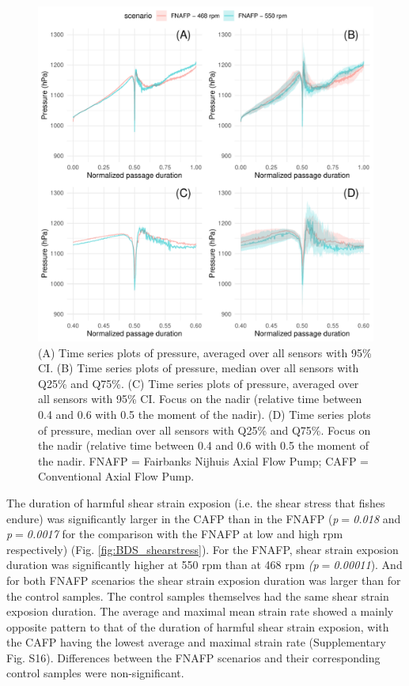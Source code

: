 \documentclass[fleqn,10pt]{wlscirep}
\begin{document}
\begin{figure}[ht]
  \centering
  \includegraphics[scale=0.7]{timeseries_selection}
  \caption{(A) Time series plots of pressure, averaged over all sensors with 95\% CI. (B) Time series plots of pressure, median over all sensors with Q25\% and Q75\%. (C) Time series plots of pressure, averaged over all sensors with 95\% CI. Focus on the nadir (relative time between 0.4 and 0.6 with 0.5 the moment of the nadir). (D) Time series plots of pressure, median over all sensors with Q25\% and Q75\%. Focus on the nadir (relative time between 0.4 and 0.6 with 0.5 the moment of the nadir. FNAFP = Fairbanks Nijhuis Axial Flow Pump; CAFP = Conventional Axial Flow Pump.}
  \label{fig:timeseries_selection}
\end{figure}

The duration of harmful shear strain exposion (i.e. the shear stress that fishes endure) was significantly larger in the CAFP than in the FNAFP (\textit{p$=$0.018} and \textit{p$=$0.0017} for the comparison with the FNAFP at low and high rpm respectively) (Fig. \ref{fig:BDS_shearstress}). For the FNAFP, shear strain exposion duration was significantly higher at 550 rpm than at 468 rpm \textit{(p$=$0.00011}). And for both FNAFP scenarios the shear strain exposion duration was larger than for the control samples. The control samples themselves had the same shear strain exposion duration. The average and maximal mean strain rate showed a mainly opposite pattern to that of the duration of harmful shear strain exposion, with the CAFP having the lowest average and maximal strain rate (Supplementary Fig. S16). Differences between the FNAFP scenarios and their corresponding control samples were non-significant. 
\end{document}
